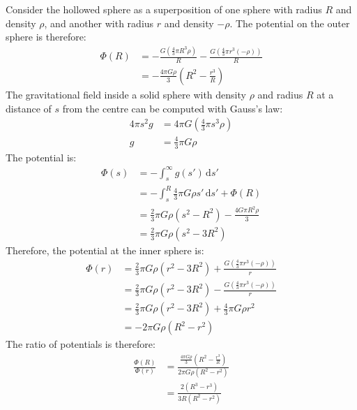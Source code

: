 \begin{solution}
    \begin{subsolution}
        Consider the hollowed sphere as a superposition of one sphere with radius $R$ and density $\rho$, and another with radius $r$ and density $-\rho$. The potential on the outer sphere is therefore:
        \begin{align*}
            \Phi(R)&=-\frac{G\left(\frac{4}{3}\pi R^3 \rho\right)}{R}-\frac{G\left(\frac{4}{3}\pi r^3 (-\rho)\right)}{R}\\
            &=-\frac{4\pi G \rho}{3}\left(R^2-\frac{r^3}{R}\right)
        \end{align*}
        The gravitational field inside a solid sphere with density $\rho$ and radius $R$ at a distance of $s$ from the centre can be computed with Gauss's law:
        \begin{align*}
            4\pi s^2 g&=4\pi G\left(\frac{4}{3}\pi s^3 \rho\right)\\
            g&=\frac{4}{3}\pi G \rho 
        \end{align*}
        The potential is:
        \begin{align*}
            \Phi(s)&=-\int_{s}^{\infty}g(s')\,\mathrm{d}s'\\
            &=-\int_{s}^{R}\frac{4}{3}\pi G \rho s'\,\mathrm{d}s' + \Phi(R)\\
            &=\frac{2}{3}\pi G \rho (s^2-R^2)-\frac{4G\pi R^2 \rho}{3}\\
            &=\frac{2}{3}\pi G \rho (s^2-3R^2)
        \end{align*}
        Therefore, the potential at the inner sphere is:
        \begin{align*}
            \Phi(r)&=\frac{2}{3}\pi G \rho (r^2-3R^2)+\frac{G\left(\frac{4}{3}\pi r^3 (-\rho)\right)}{r}\\
            &=\frac{2}{3}\pi G \rho (r^2-3R^2)-\frac{G\left(\frac{4}{3}\pi r^3 (-\rho)\right)}{r}\\
            &=\frac{2}{3}\pi G \rho (r^2-3R^2)+\frac{4}{3}\pi G \rho r^2\\
            &=-2\pi G \rho (R^2-r^2)
        \end{align*}
        The ratio of potentials is therefore:
        \begin{align*}
            \frac{\Phi(R)}{\Phi(r)}&=\frac{\frac{4\pi G\rho}{3}\left(R^2-\frac{r^3}{R}\right)}{2\pi G \rho (R^2-r^2)}\\
            &=\boxed{\frac{2\left(R^3-r^3\right)}{3R(R^2-r^2)}}
        \end{align*}

\end{subsolution}
\end{solution}
